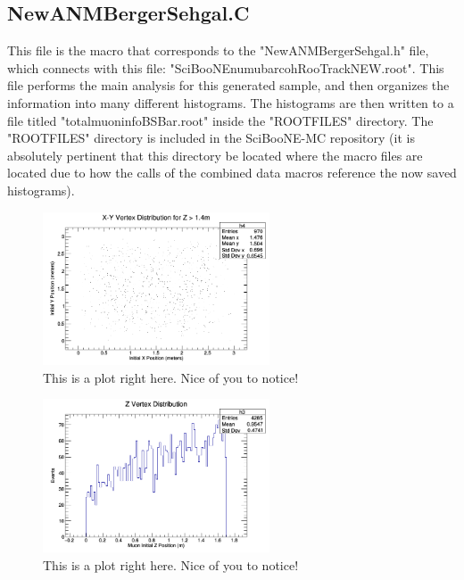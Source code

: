 \documentclass[11pt]{article}
\begin{document}
\subsection{NewANMBergerSehgal.C}
This file is the macro that corresponds to the "NewANMBergerSehgal.h" file, which connects with this file: "SciBooNE\textunderscore numubar\textunderscore coh\textunderscore RooTrack\textunderscore NEW.root". This file performs the main analysis for this generated sample, and then organizes the information into many different histograms. The histograms are then written to a file titled "totalmuoninfoBSBar.root" inside the "ROOTFILES" directory. The "ROOTFILES" directory is included in the SciBooNE-MC repository (it is absolutely pertinent that this directory be located where the macro files are located due to how the calls of the combined data macros reference the now saved histograms).

\begin{figure}[H]
\centering
\includegraphics[width=0.6\textwidth]{NewANMBergerSehgalImages/1-X-YVertexDistributionANMBS.png}
\caption{This is a plot right here. Nice of you to notice!}
\end{figure}

\begin{figure}[H]
\centering
\includegraphics[width=0.6\textwidth]{NewANMBergerSehgalImages/2-ZVertexDistributionANMBS.png}
\caption{This is a plot right here. Nice of you to notice!}
\end{figure}
\end{document}
